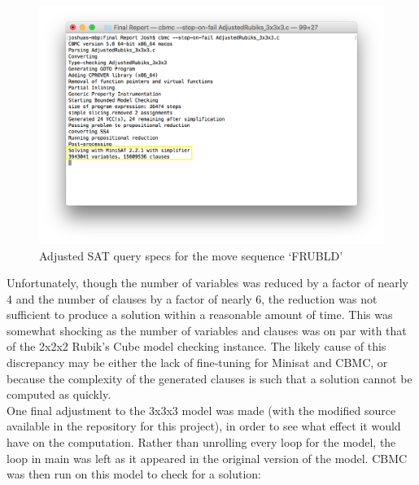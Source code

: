 \documentclass{article}
\begin{document}
\begin{figure}[h]
\includegraphics[width=\textwidth]{pics/3x3x3Adjusted_SAT_Query_Specs.png}
\caption{Adjusted SAT query specs for the move sequence `FRUBLD'}
\end{figure}

\noindent Unfortunately, though the number of variables was reduced by a factor of nearly 4 and the number of clauses by a factor of nearly 6, the reduction was not sufficient to produce a solution within a reasonable amount of time. This was somewhat shocking as the number of variables and clauses was on par with that of the 2x2x2 Rubik's Cube model checking instance. The likely cause of this discrepancy may be either the lack of fine-tuning for Minisat and CBMC, or because the complexity of the generated clauses is such that a solution cannot be computed as quickly. \\

\noindent One final adjustment to the 3x3x3 model was made (with the modified source available in the repository for this project), in order to see what effect it would have on the computation. Rather than unrolling every loop for the model, the loop in main was left as it appeared in the original version of the model. CBMC was then run on this model to check for a solution:\\
\end{document}
